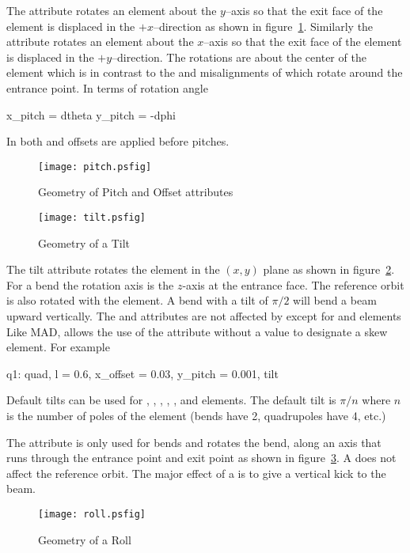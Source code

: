 The  attribute rotates an element about the $y$--axis so
that the exit face of the element is displaced in the $+x$--direction
as shown in figure~\ref{f:pitch}. Similarly the  attribute
rotates an element about the $x$--axis so that the exit face of the
element is displaced in the $+y$--direction. The rotations are about
the center of the element which is in contrast to the  and
 misalignments of \mad which rotate around the entrance
point. In terms of rotation angle
\begin{example}
  x_pitch =  dtheta
  y_pitch = -dphi
\end{example}
In both \bmad and \mad offsets are applied before pitches.
\begin{figure}
  \centering
  \texttt{[image: pitch.psfig]}
  \caption{Geometry of Pitch and Offset attributes}
  \label{f:pitch}
\end{figure}

\begin{figure}
  \centering
  \texttt{[image: tilt.psfig]}
  \caption{Geometry of a Tilt}
  \label{f:tilt}
\end{figure}

The tilt attribute rotates the element in the $(x, y)$ plane as
shown in figure~\ref{f:tilt}. For a bend the rotation axis is the
$z$-axis at the entrance face. The reference orbit is also rotated
with the element. A bend with a tilt of $\pi/2$ will bend a beam
upward vertically. The  and  attributes are
not affected by  except for  and 
elements
Like MAD, \bmad allows the use of the  attribute without
a value to designate a skew element. For example
\begin{example}
  q1: quad, l = 0.6, x_offset = 0.03, y_pitch = 0.001, tilt
\end{example}
Default tilts can be used for , , ,
, , and  elements.
The default tilt is $\pi/n$ where $n$ is the number of poles of the
element (bends have 2, quadrupoles have 4, etc.) 


The  attribute is only used for bends
and rotates the bend, along an axis that runs through the entrance
point and exit point as shown in figure~\ref{f:roll}. A  
does not affect the reference orbit. The major effect of a 
is to give a vertical kick to the beam.
\begin{figure}
  \centering
  \texttt{[image: roll.psfig]}
  \caption{Geometry of a Roll}
  \label{f:roll}
\end{figure}


